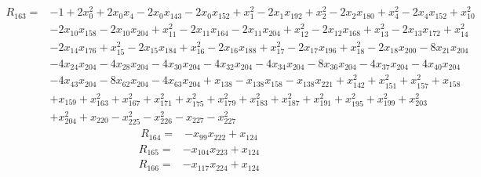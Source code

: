 \begin{align*}
 R_{163}={}&-1 +2x_{0}^{2} +2x_{0}x_{4} -2x_{0}x_{143} -2x_{0}x_{152} +x_{1}^{2} -2x_{1}x_{192} +x_{2}^{2} -2x_{2}x_{180} +x_{4}^{2} -2x_{4}x_{152} +x_{10}^{2}\\
 &-2x_{10}x_{158} -2x_{10}x_{204} +x_{11}^{2} -2x_{11}x_{164} -2x_{11}x_{204} +x_{12}^{2} -2x_{12}x_{168} +x_{13}^{2} -2x_{13}x_{172} +x_{14}^{2}\\
 &-2x_{14}x_{176} +x_{15}^{2} -2x_{15}x_{184} +x_{16}^{2} -2x_{16}x_{188} +x_{17}^{2} -2x_{17}x_{196} +x_{18}^{2} -2x_{18}x_{200} -8x_{21}x_{204}\\
 &-4x_{24}x_{204} -4x_{28}x_{204} -4x_{30}x_{204} -4x_{32}x_{204} -4x_{34}x_{204} -8x_{36}x_{204} -4x_{37}x_{204} -4x_{40}x_{204}\\
 &-4x_{43}x_{204} -8x_{62}x_{204} -4x_{63}x_{204} +x_{138} -x_{138}x_{158} -x_{138}x_{221} +x_{142}^{2} +x_{151}^{2} +x_{157}^{2} +x_{158}\\
 &+x_{159} +x_{163}^{2} +x_{167}^{2} +x_{171}^{2} +x_{175}^{2} +x_{179}^{2} +x_{183}^{2} +x_{187}^{2} +x_{191}^{2} +x_{195}^{2} +x_{199}^{2} +x_{203}^{2}\\
 &+x_{204}^{2} +x_{220} -x_{225}^{2} -x_{226}^{2} -x_{227} -x_{227}^{2}
\end{align*}
\begin{align*}
 R_{164}={}&-x_{99}x_{222} +x_{124}
\end{align*}
\begin{align*}
 R_{165}={}&-x_{104}x_{223} +x_{124}
\end{align*}
\begin{align*}
 R_{166}={}&-x_{117}x_{224} +x_{124}
\end{align*}
